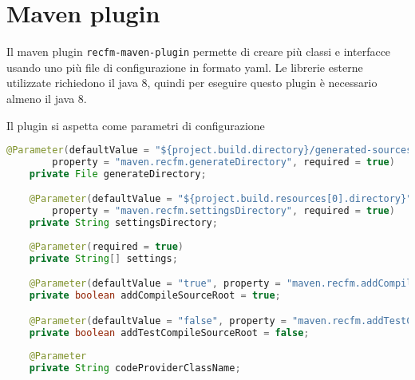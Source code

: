 \documentclass[a4paper,10pt]{report}
\begin{document}
\section{Maven plugin}
Il maven plugin \verb!recfm-maven-plugin! permette di creare più classi e 
interfacce usando uno più file di configurazione in formato yaml.
Le librerie esterne utilizzate richiedono il java 8, quindi per eseguire questo 
plugin è necessario almeno il java 8.

Il plugin si aspetta come parametri di configurazione
\begin{figure*}[!htb]
\begin{lstlisting}[language=java, caption=parametri impostabili del maven plugin, 
label=lst:spring-conf]
    @Parameter(defaultValue = "${project.build.directory}/generated-sources/recfm",
        property = "maven.recfm.generateDirectory", required = true)
    private File generateDirectory;

    @Parameter(defaultValue = "${project.build.resources[0].directory}",
        property = "maven.recfm.settingsDirectory", required = true)
    private String settingsDirectory;
    
    @Parameter(required = true)
    private String[] settings;

    @Parameter(defaultValue = "true", property = "maven.recfm.addCompileSourceRoot")
    private boolean addCompileSourceRoot = true;

    @Parameter(defaultValue = "false", property = "maven.recfm.addTestCompileSourceRoot")
    private boolean addTestCompileSourceRoot = false;
    
    @Parameter
    private String codeProviderClassName;
\end{lstlisting}
\end{figure*}
\end{document}
